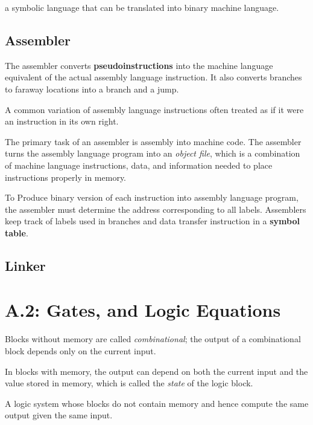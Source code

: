 \documentclass[12pt]{article}
\begin{document}
\begin{definition}
    a symbolic language that can be translated into binary machine language.
\end{definition}

\subsection*{Assembler}
The assembler converts \textbf{pseudoinstructions} into the machine language equivalent of the actual assembly language instruction. It also converts branches to faraway locations into a branch and a jump.
\begin{definition}[Pseudoinstructions]
    A common variation of assembly language instructions often treated as if it were an instruction in its own right.
\end{definition}
The primary task of an assembler is assembly into machine code. The assembler turns the assembly language program into an \emph{object file}, which is a combination of machine language instructions, data, and information needed to place instructions properly in memory.

To Produce binary version of each instruction into assembly language program, the assembler must determine the address corresponding to all labels. Assemblers keep track of labels used in branches and data transfer instruction in a \textbf{symbol table}.

\subsection*{Linker}




\section*{A.2: Gates, and Logic Equations}
Blocks without memory are called \emph{combinational}; the output of a combinational block depends only on the current input.

In blocks with memory, the output can depend on both the current input and the value stored in memory, which is called the \emph{state} of the logic block.

\begin{definition}
    A logic system whose blocks do not contain memory and hence compute the same output given the same input.
\end{definition}
\end{document}
